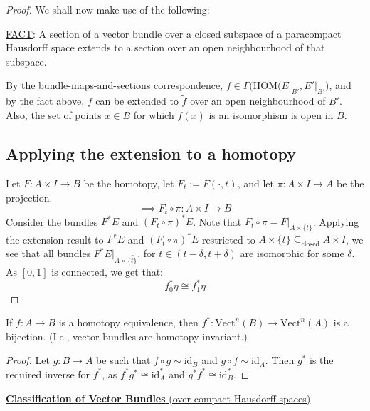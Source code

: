 \documentclass[11pt,a4paper]{article}
\begin{document}
\begin{proof}
We shall now make use of the following:

\underline{FACT}: A section of a vector bundle over a closed subspace of a paracompact Hausdorff space extends to a section over an open neighbourhood of that subspace.

By the bundle-maps-and-sections correspondence, $f\in \Gamma\big(\text{HOM}(E\big|_{B'}, E'\big|_{B'}\big)$, and by the fact above, $f$ can be extended to $\widetilde{f}$ over an open neighbourhood of $B'$. Also, the set of points $x\in B$ for which $\widetilde f(x)$ is an isomorphism is open in $B$.

\subsection*{Applying the extension to a homotopy} Let $F: A\times I\rightarrow B$ be the homotopy, let $F_t:= F(\cdot, t)$, and let $\pi:A\times I\rightarrow A$ be the projection.
$$\implies F_t\circ \pi : A\times I \rightarrow B$$
Consider the bundles $F^*E$ and $(F_t\circ \pi)^*E$. Note that $F_t\circ \pi = F\big|_{A\times \{t\}}$. Applying the extension result to $F^*E$ and $(F_t\circ \pi)^*E$ restricted to $A\times \{t\} \subseteq_{\text{closed}} A\times I$, we see that all bundles $F^*E\big|_{A\times \{\widetilde{t\}}}$, for $\widetilde{t} \in (t-\delta, t+\delta)$ are isomorphic for some $\delta$. As $[0,1]$ is connected, we get that:
$$f_0^*\eta \cong f_1^*\eta$$
\end{proof}


\begin{corollary}
    If $f:A\rightarrow B$ is a homotopy equivalence, then $f^*: \text{Vect}^n(B)\rightarrow \text{Vect}^n(A)$ is a bijection. (I.e., vector bundles are homotopy invariant.)
\end{corollary}
\begin{proof}
    Let $g:B\rightarrow A$ be such that $f\circ g \sim \text{id}_B$ and $g\circ f\sim \text{id}_A$. Then $g^*$ is the required inverse for $f^*$, as $f^*g^* \cong \text{id}^*_A$ and $g^*f^* \cong \text{id}^*_B$.
\end{proof}

\underline{\textbf{Classification of Vector Bundles} (over compact Hausdorff spaces)}
\end{document}

